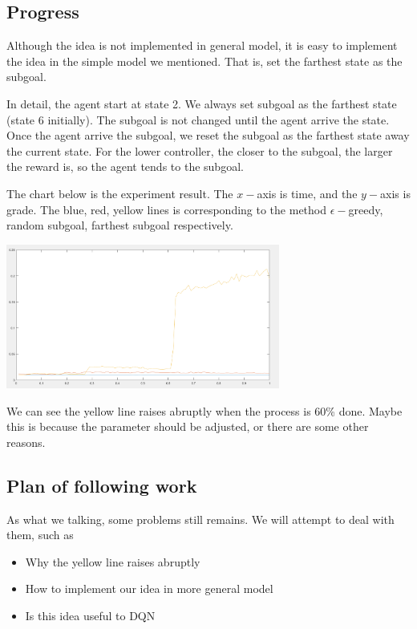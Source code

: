 \documentclass{article}
\begin{document}
\begin{spacing}{1.1}
    \subsection{Progress}

    Although the idea is not implemented in general model, it is easy to implement the idea in the simple model we mentioned. That is, set the farthest state as the subgoal.

    In detail, the agent start at state 2. We always set subgoal as the farthest state (state 6 initially). The subgoal is not changed until the agent arrive the state. Once the agent arrive the subgoal, we reset the subgoal as the farthest state away the current state. For the lower controller, the closer to the subgoal, the larger the reward is, so the agent tends to the subgoal.

    The chart below is the experiment result. The $x-$axis is time, and the $y-$axis is grade. The blue, red, yellow lines is corresponding to the method $\epsilon-$greedy, random subgoal, farthest subgoal respectively.

    \includegraphics[width=90mm]{1.png}

    We can see the yellow line raises abruptly when the process is 60\% done. Maybe this is because the parameter should be adjusted, or there are some other reasons.

    \subsection{Plan of following work}

    As what we talking, some problems still remains. We will attempt to deal with them, such as
    \begin{itemize}
        \item Why the yellow line raises abruptly
        \item How to implement our idea in more general model
        \item Is this idea useful to DQN
    \end{itemize}


\end{spacing}
\end{document}
